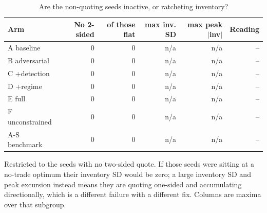 \begin{table}[htbp]
  \centering
  \caption{Are the non-quoting seeds inactive, or ratcheting inventory?}
  \label{tab:inventory}
  \begin{tabular}{lrrrrr}
    \toprule
    Arm & No 2-sided & of those flat & max inv. SD & max peak $|$inv$|$ & Reading \\
    \midrule
    A  baseline & 0 & 0 & n/a & n/a & -- \\
    B  adversarial & 0 & 0 & n/a & n/a & -- \\
    C  +detection & 0 & 0 & n/a & n/a & -- \\
    D  +regime & 0 & 0 & n/a & n/a & -- \\
    E  full & 0 & 0 & n/a & n/a & -- \\
    F  unconstrained & 0 & 0 & n/a & n/a & -- \\
    A-S benchmark & 0 & 0 & n/a & n/a & -- \\
    \bottomrule
  \end{tabular}
  \begin{minipage}{\linewidth}\vspace{4pt}\footnotesize Restricted to the seeds with no two-sided quote. If those seeds were sitting at a no-trade optimum their inventory SD would be zero; a large inventory SD and peak excursion instead means they are quoting one-sided and accumulating directionally, which is a different failure with a different fix. Columns are maxima over that subgroup.\end{minipage}
\end{table}

